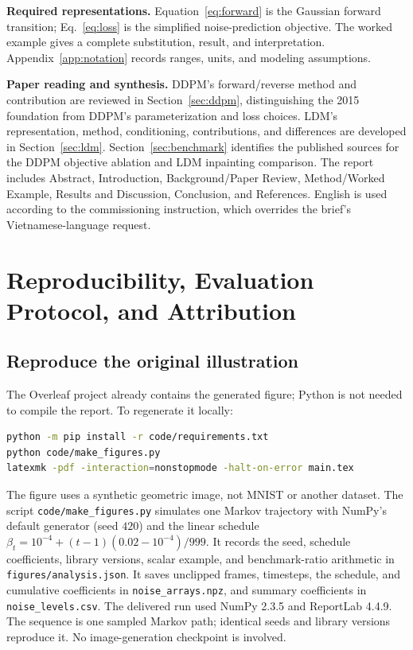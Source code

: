 \balance
\textbf{Required representations.}
Equation~\eqref{eq:forward} is the Gaussian forward transition;
Eq.~\eqref{eq:loss} is the simplified noise-prediction objective.
The worked example gives a complete substitution, result, and interpretation.
Appendix~\ref{app:notation} records ranges, units, and modeling assumptions.

\textbf{Paper reading and synthesis.}
DDPM's forward/reverse method and contribution are reviewed in
Section~\ref{sec:ddpm}, distinguishing the 2015 foundation from DDPM's
parameterization and loss choices. LDM's representation, method, conditioning,
contributions, and differences are developed in
Section~\ref{sec:ldm}.
Section~\ref{sec:benchmark} identifies the published sources for the
DDPM objective ablation and LDM inpainting comparison. The report includes Abstract, Introduction, Background/Paper Review,
Method/Worked Example, Results and Discussion, Conclusion, and References.
English is used according to the commissioning instruction, which overrides
the brief's Vietnamese-language request.

\pagecut
\section{Reproducibility, Evaluation Protocol, and Attribution}\label{app:repro}
\subsection{Reproduce the original illustration}
The Overleaf project already contains the generated figure; Python is not
needed to compile the report. To regenerate it locally:
\begin{lstlisting}[language=bash]
python -m pip install -r code/requirements.txt
python code/make_figures.py
latexmk -pdf -interaction=nonstopmode -halt-on-error main.tex
\end{lstlisting}
The figure uses a synthetic geometric image, not MNIST or another dataset.
The script \texttt{code/make\_figures.py} simulates one Markov trajectory
with NumPy's default generator (seed $420$) and the linear schedule
$\beta_t=10^{-4}+(t-1)(0.02-10^{-4})/999$.
It records the seed, schedule coefficients, library versions,
scalar example, and benchmark-ratio arithmetic in
\texttt{figures/analysis.json}. It saves unclipped frames, timesteps, the
schedule, and cumulative coefficients in \texttt{noise\_arrays.npz},
and summary coefficients in \texttt{noise\_levels.csv}.
The delivered run used NumPy 2.3.5 and ReportLab 4.4.9.
The sequence is one sampled Markov path; identical seeds and library
versions reproduce it. No image-generation checkpoint is involved.

